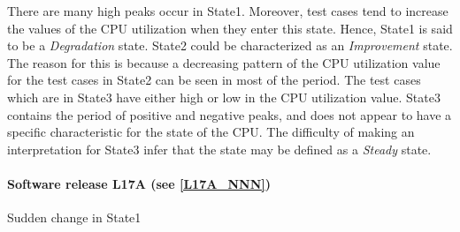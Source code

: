 \begin{comment}
\begin{itemize}
\item State1 

There are many high peaks occur in this state. Moreover, test cases
tend to increase the value of the CPU utilization when they remain
in the state. A \emph{Degradation} state is adequate for defining
behavior in this state.
\item State2 

The state could be characterized as an \emph{Improvement} state. A
decreasing pattern of the CPU utilization value can be seen in most
of the period.
\item State3 

The CPU utilization value for test cases in this state are either
high or low. The state contains the period of positive and negative
peaks and does not appear to have a specific characteristic for the
state of the CPU. For this reason, the state is said to be a \emph{Steady}
state.
\end{itemize}
\end{comment}

There are many high peaks occur in State1. Moreover, test cases tend
to increase the values of the CPU utilization when they enter this
state. Hence, State1 is said to be a \emph{Degradation} state. State2
could be characterized as an \emph{Improvement} state. The reason
for this is because a decreasing pattern of the CPU utilization value
for the test cases in State2 can be seen in most of the period. The
test cases which are in State3 have either high or low in the CPU
utilization value. State3 contains the period of positive and negative
peaks, and does not appear to have a specific characteristic for the
state of the CPU. The difficulty of making an interpretation for State3
infer that the state may be defined as a \emph{Steady} state.

\paragraph{Software release L17A (see \ref{L17A_NNN})}

\begin{comment}
\begin{itemize}
\item State1 

There a \emph{Degradation} state
\item State2 

Most of observations in the state have a decreasing pattern when enter
this state which is often comes from State1. As a consequence, an
\emph{Improvement} state is given for this state. 
\item State3 

The values of the CPU utilization for observations in the state have
an unclear pattern. The value is quite fluctuate and because of this
behavior, the state is labeled as a \emph{Steady} state. There is
a peak in the time series data which is viewed as an anomaly in this
case. 
\end{itemize}
\end{comment}
{} Sudden change in State1

